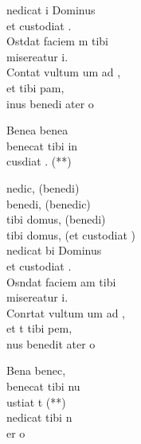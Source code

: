 \documentclass[12pt]{article}
\begin{document}
\begin{multicols*}{2}
\begin{cancion}[Benedicat][]%
	nedicat i Dominus \\
	et custodiat .\\
	Ostdat faciem m tibi\\
	 misereatur i.\\
	Contat vultum um ad ,\\
	et  tibi pam,\\
	inus benedi ater o \\
	\begin{chorus}%
	Benea     benea \\
	benecat tibi in\\
	 cusdiat . (**)\\
	\end{chorus}%
	nedic, (benedi)\\
	benedi, (benedic)\\
	tibi domus, (benedi)\\
	tibi domus, (et custodiat )\\
	nedicat bi Dominus\\
	et custodiat .\\
	Osndat faciem am tibi\\
	 misereatur i.\\
	Conrtat vultum um ad ,\\
	et t tibi pem,\\
	nus benedit ater o \\
	\begin{chorus}%
	Bena     benec,\\
	benecat tibi nu\\
	ustiat t (**)\\
	nedicat tibi n\\
	er o \\
	\end{chorus}%
\end{cancion}%


\end{multicols*}
\end{document}
